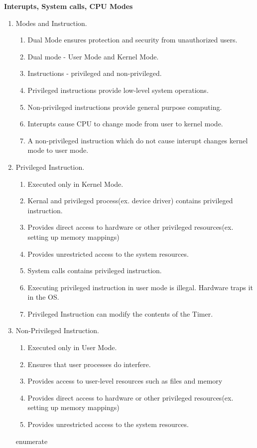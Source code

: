 
\centerline{\textbf{ \LARGE Interupts, System calls, CPU Modes}}


\begin{enumerate}
  \item Modes and Instruction.
  \begin{enumerate}
        \item Dual Mode ensures protection and security from unauthorized users.
        \item Dual mode - User Mode and Kernel Mode.
        \item Instructions - privileged and non-privileged.
        \item Privileged instructions provide low-level system operations.
        \item Non-privileged instructions provide general purpose computing.
        \item Interupts cause CPU to change mode from user to kernel mode.
        \item A non-privileged instruction which do not cause interupt changes kernel mode to user mode.
  \end{enumerate}

  \item Privileged Instruction.
  \begin{enumerate}
        \item Executed only in Kernel Mode.
        \item Kernal and privileged process(ex. device driver) contains privileged instruction.
        \item Provides direct access to hardware or other privileged resources(ex. setting up memory mappings)
        \item Provides unrestricted access to the system resources.
        \item System calls contains privileged instruction.
        \item Executing privileged instruction in user mode is illegal. Hardware traps it in the OS.
        \item Privileged Instruction can modify the contents of the Timer.
  \end{enumerate}

  \item Non-Privileged Instruction.
  \begin{enumerate}
        \item Executed only in User Mode.
        \item Ensures that user processes do interfere.
        \item Provides access to user-level resources such as files and memory
        \item Provides direct access to hardware or other privileged resources(ex. setting up memory mappings)
        \item Provides unrestricted access to the system resources.
  \end{enumerate}{enumerate}


\end{enumerate}
